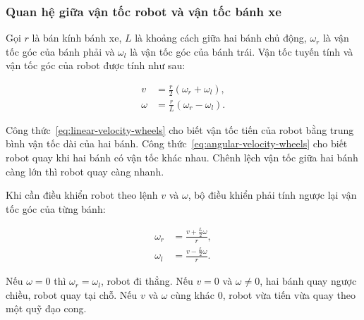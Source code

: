 \subsubsection{Quan hệ giữa vận tốc robot và vận tốc bánh xe}
\label{subsubsec:wheel-velocity-relation}

Gọi $r$ là bán kính bánh xe, $L$ là khoảng cách giữa hai bánh chủ động, $\omega_r$ là vận tốc góc của bánh phải và $\omega_l$ là vận tốc góc của bánh trái. Vận tốc tuyến tính và vận tốc góc của robot được tính như sau:

\begin{align}
    v &= \frac{r}{2}\left(\omega_r + \omega_l\right), \label{eq:linear-velocity-wheels}\\
    \omega &= \frac{r}{L}\left(\omega_r - \omega_l\right). \label{eq:angular-velocity-wheels}
\end{align}

Công thức~\eqref{eq:linear-velocity-wheels} cho biết vận tốc tiến của robot bằng trung bình vận tốc dài của hai bánh. Công thức~\eqref{eq:angular-velocity-wheels} cho biết robot quay khi hai bánh có vận tốc khác nhau. Chênh lệch vận tốc giữa hai bánh càng lớn thì robot quay càng nhanh.

Khi cần điều khiển robot theo lệnh $v$ và $\omega$, bộ điều khiển phải tính ngược lại vận tốc góc của từng bánh:

\begin{align}
    \omega_r &= \frac{v + \frac{L}{2}\omega}{r}, \label{eq:right-wheel-speed}\\
    \omega_l &= \frac{v - \frac{L}{2}\omega}{r}. \label{eq:left-wheel-speed}
\end{align}

Nếu $\omega = 0$ thì $\omega_r = \omega_l$, robot đi thẳng. Nếu $v=0$ và $\omega \neq 0$, hai bánh quay ngược chiều, robot quay tại chỗ. Nếu $v$ và $\omega$ cùng khác $0$, robot vừa tiến vừa quay theo một quỹ đạo cong.

